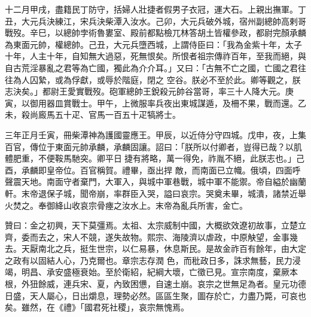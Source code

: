 \begin{pinyinscope}
 十二月甲戌，盡籍民丁防守，括婦人壯捷者假男子衣冠，運大石。上親出撫軍。丁丑，大元兵決練江，宋兵決柴潭入汝水。己卯，大元兵破外城，宿州副總帥高剌哥戰歿。辛巳，以總帥孛術魯婁室、殿前都點檢兀林答胡土皆權參政，都尉完顏承麟為東面元帥，權總帥。己丑，大元兵墮西城，上謂侍臣曰：「我為金紫十年，太子十年，人主十年，自知無大過惡，死無恨矣。所恨者祖宗傳祚百年，至我而絕，與自古荒淫暴亂之君等為亡國，獨此為介介耳。」又曰：「古無不亡之國，亡國之君往往為人囚縶，或為俘獻，或辱於階庭，閉之
 空谷。朕必不至於此。卿等觀之，朕志決矣。」都尉王愛實戰歿。砲軍總帥王銳殺元帥谷當哥，率三十人降大元。庚寅，以御用器皿賞戰士。甲午，上微服率兵夜出東城謀遁，及柵不果，戰而還。乙未，殺尚廄馬五十疋、官馬一百五十疋犒將士。



 三年正月壬寅，冊柴潭神為護國靈應王。甲辰，以近侍分守四城。戊申，夜，上集百官，傳位于東面元帥承麟，承麟固讓。詔曰：「朕所以付卿者，豈得已哉？以肌體肥重，不便鞍馬馳突。卿平日捷有將略，萬一得免，祚胤不絕，此朕志也。」己酉，承麟即皇帝位。百官稱賀。禮畢，亟出捍
 敵，而南面已立幟。俄頃，四面呼聲震天地。南面守者棄門，大軍入，與城中軍巷戰，城中軍不能禦。帝自縊於幽蘭軒。末帝退保子城，聞帝崩，率群臣入哭，謚曰哀宗。哭奠未畢，城潰，諸禁近舉火焚之。奉御絳山收哀宗骨瘞之汝水上。末帝為亂兵所害，金亡。



 贊曰：金之初興，天下莫彊焉。太祖、太宗威制中國，大概欲效遼初故事，立楚立齊，委而去之，宋人不競，遂失故物。熙宗、海陵濟以虐政，中原觖望，金事幾去。天厭南北之兵，挺生世宗，以仁易暴，休息斯民。是故金祚百有餘年，由大定之政有以固結人心，乃克爾也。章宗志存潤
 色，而秕政日多，誅求無藝，民力浸竭，明昌、承安盛極衰始。至於衛紹，紀綱大壞，亡徵已見。宣宗南度，棄厥本根，外狃餘威，連兵宋、夏，內致困憊，自速土崩。哀宗之世無足為者。皇元功德日盛，天人屬心，日出爝息，理勢必然。區區生聚，圖存於亡，力盡乃斃，可哀也矣。雖然，在《禮》「國君死社稷」，哀宗無愧焉。



\end{pinyinscope}